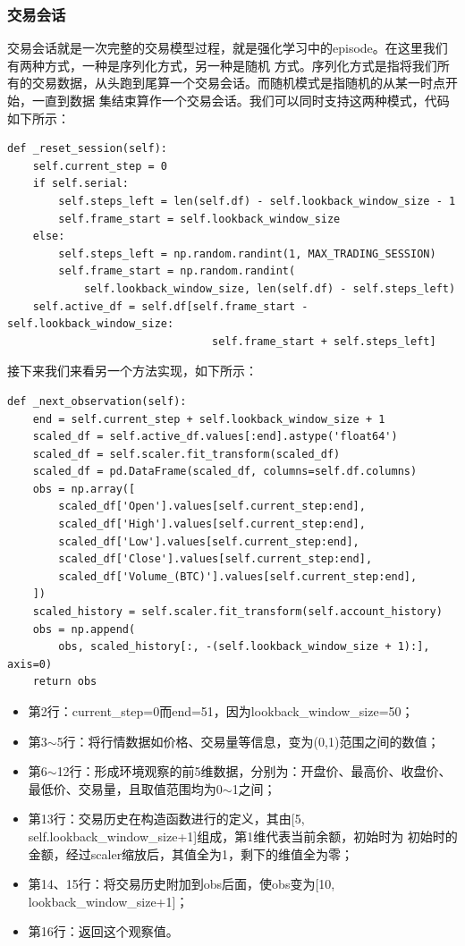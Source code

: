 \documentclass{article}
\begin{document}
\subsubsection{交易会话}
交易会话就是一次完整的交易模型过程，就是强化学习中的episode。在这里我们有两种方式，一种是序列化方式，另一种是随机
方式。序列化方式是指将我们所有的交易数据，从头跑到尾算一个交易会话。而随机模式是指随机的从某一时点开始，一直到数据
集结束算作一个交易会话。我们可以同时支持这两种模式，代码如下所示：
\begin{lstlisting}
def _reset_session(self):
    self.current_step = 0
    if self.serial:
        self.steps_left = len(self.df) - self.lookback_window_size - 1
        self.frame_start = self.lookback_window_size
    else:
        self.steps_left = np.random.randint(1, MAX_TRADING_SESSION)
        self.frame_start = np.random.randint(
            self.lookback_window_size, len(self.df) - self.steps_left)
    self.active_df = self.df[self.frame_start - self.lookback_window_size:
                                self.frame_start + self.steps_left]
\end{lstlisting}
接下来我们来看另一个方法实现，如下所示：
\begin{lstlisting}
def _next_observation(self):
    end = self.current_step + self.lookback_window_size + 1
    scaled_df = self.active_df.values[:end].astype('float64')
    scaled_df = self.scaler.fit_transform(scaled_df)
    scaled_df = pd.DataFrame(scaled_df, columns=self.df.columns)
    obs = np.array([
        scaled_df['Open'].values[self.current_step:end],
        scaled_df['High'].values[self.current_step:end],
        scaled_df['Low'].values[self.current_step:end],
        scaled_df['Close'].values[self.current_step:end],
        scaled_df['Volume_(BTC)'].values[self.current_step:end],
    ])
    scaled_history = self.scaler.fit_transform(self.account_history)
    obs = np.append(
        obs, scaled_history[:, -(self.lookback_window_size + 1):], axis=0)
    return obs
\end{lstlisting}

\begin{itemize}
\item 第2行：current\_step=0而end=51，因为lookback\_window\_size=50；
\item 第3$\sim$5行：将行情数据如价格、交易量等信息，变为(0,1)范围之间的数值；
\item 第6$\sim$12行：形成环境观察的前5维数据，分别为：开盘价、最高价、收盘价、最低价、交易量，且取值范围均为0$\sim$1之间；
\item 第13行：交易历史在构造函数进行的定义，其由[5, self.lookback\_window\_size+1]组成，第1维代表当前余额，初始时为
初始时的金额，经过scaler缩放后，其值全为1，剩下的维值全为零；
\item 第14、15行：将交易历史附加到obs后面，使obs变为[10, lookback\_window\_size+1]；
\item 第16行：返回这个观察值。
\end{itemize}
\end{document}
